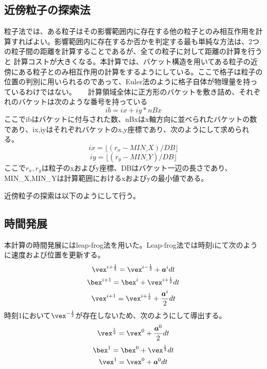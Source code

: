 \documentclass[]{jsarticle}
\begin{document}
\subsection{近傍粒子の探索法}
粒子法では、ある粒子はその影響範囲内に存在する他の粒子とのみ相互作用を計算すればよい。影響範囲内に存在するか否かを判定する最も単純な方法は、2つの粒子間の距離を計算することであるが、全ての粒子に対して距離の計算を行うと
計算コストが大きくなる。本計算では、バケット構造を用いてある粒子の近傍にある粒子とのみ相互作用の計算をするようにしている。\cite{Koshiduka2014}ここで格子は粒子の位置の判別に用いられるのであって、Euler法のように格子自体が物理量を持っているわけではない。
　
計算領域全体に正方形のバケットを敷き詰め、それぞれのバケットは次のような番号を持っている
\begin{equation}
ib=ix+iy*nBx
\end{equation}
ここでibはバケットに付与された数、nBxはx軸方向に並べられたバケットの数であり、ix,iyはそれぞれバケットのx,y座標であり、次のようにして求められる。
\begin{equation}
ix=\lfloor(r_x-MIN\_X)/DB \rfloor
\end{equation}
\begin{equation}
iy=\lfloor(r_y-MIN\_Y)/DB \rfloor
\end{equation}
ここで$r_x,r_y$は粒子のxおよびy座標、DBはバケット一辺の長さであり、MIN\_X,MIN\_Yは計算範囲におけるxおよびyの最小値である。

近傍粒子の探索は以下のようにして行う。


\subsection{時間発展}
本計算の時間発展にはleap-frog法を用いた。Leap-frog法では時刻iにて次のように速度および位置を更新する。
\begin{equation}
  \vex^{i+\frac{1}{2}}=\vex^{i-\frac{1}{2}}+\bm{a}^idt
\end{equation}
\begin{equation}
  \bex^{i+1}=\bex^i+\vex^{i+\frac{1}{2}}dt
\end{equation}
\begin{equation}
  \vex^{i+1}=\vex^{i+\frac{1}{2}}+\frac{\bm{a}^i}{2}dt
\end{equation}
時刻1において$\vex^{-\frac{1}{2}}$が存在しないため、次のようにして導出する。
\begin{equation}
  \vex^{\frac{1}{2}}=\vex^{0}+\frac{\bm{a}^0}{2}dt
\end{equation}
\begin{equation}
  \bex^{1}=\bex^0+\vex^{\frac{1}{2}}dt
\end{equation}
\begin{equation}
  \vex^{1}=\vex^{0}+\bm{a}^0dt
\end{equation}
\end{document}
